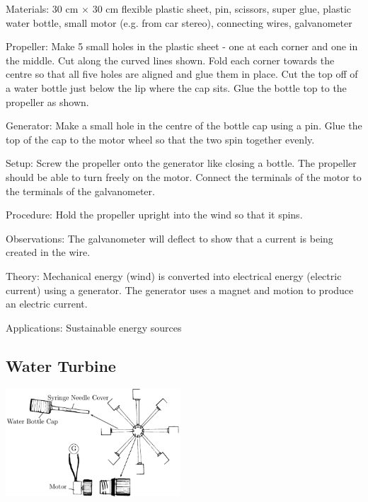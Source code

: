 \begin{multicols}{2}
\begin{description*}
\item[Materials:]{30 cm $\times$ 30 cm flexible plastic sheet, pin, scissors, super glue, plastic water bottle, small motor (e.g. from car stereo), connecting wires, galvanometer}
\item[Propeller:]{Make 5 small holes in the plastic sheet - one at each corner and one in the middle. Cut along the curved lines shown. Fold each corner towards the centre so that all five holes are aligned and glue them in place. Cut the top off of a water bottle just below the lip where the cap sits. Glue the bottle top to the propeller as shown. }
\item[Generator:]{Make a small hole in the centre of the bottle cap using a pin. Glue the top of the cap to the motor wheel so that the two spin together evenly.}
\item[Setup:]{Screw the propeller onto the generator like closing a bottle. The propeller should be able to turn freely on the motor. Connect the terminals of the motor to the terminals of the galvanometer.}
\item[Procedure:]{Hold the propeller upright into the wind so that it spins.}
\item[Observations:]{The galvanometer will deflect to show that a current is being created in the wire.}
\item[Theory:]{Mechanical energy (wind) is converted into electrical energy (electric current) using a generator. The generator uses a magnet and motion to produce an electric current.}
\item[Applications:]{Sustainable energy sources}
\end{description*}

\columnbreak

\subsection{Water Turbine}

\begin{center}
\includegraphics[width=0.49\textwidth]{./img/water-turbine.png}
\end{center}


\end{multicols}

